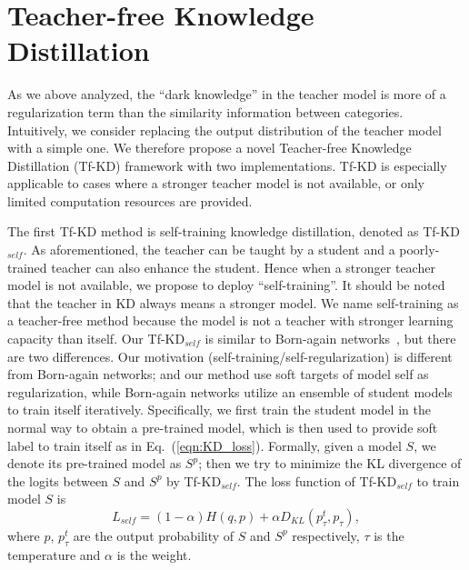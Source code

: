 \documentclass[10pt,twocolumn,letterpaper]{article}
\begin{document}

\section{Teacher-free Knowledge Distillation}
As we above analyzed, the ``dark knowledge'' in the teacher model is more of a regularization term than the similarity information between categories. Intuitively, we consider replacing the output distribution of the teacher model with a simple one. We therefore propose a novel Teacher-free Knowledge Distillation (Tf-KD) framework with two implementations. Tf-KD is especially applicable to cases where a stronger teacher model is not available, or only limited computation resources are provided. %

The first Tf-KD method is self-training knowledge distillation, denoted as Tf-KD$_{self}$. As aforementioned,  the teacher can be taught by a student and a poorly-trained teacher can also enhance the student. Hence when a stronger teacher model is not available, we propose to deploy ``self-training''. It should be noted that the teacher in KD always means a stronger model. We name self-training as a teacher-free method because the model is not a teacher with stronger learning capacity than itself. Our Tf-KD$_{self}$ is similar to Born-again networks~\cite{furlanello2018born}, but there are two differences. Our motivation (self-training/self-regularization) is different from Born-again networks; and our method use soft targets of model self as regularization, while Born-again networks utilize an ensemble of student models to train itself iteratively. Specifically, we first train the student model in the normal way to obtain a pre-trained model, which is then used to provide soft label to train itself as in Eq.~(\ref{eqn:KD_loss}). Formally, given a model $S$, we denote its pre-trained model as $S^{p}$; then we try to minimize the KL divergence of the logits between $S$ and $S^{p}$ by Tf-KD$_{self}$. The loss function of Tf-KD$_{self}$ to train model $S$ is
\begin{equation}
\label{eqn:Tf-KD_self}
    L_{self} = (1-\alpha)H(q, p) + \alpha D_{KL}(p^{t}_{\tau}, p_{\tau}),
\end{equation}
where $p$, $p^{t}_{\tau}$ are the output probability of $S$ and $S^{p}$ respectively, $\tau$ is the temperature and $\alpha$ is the weight.
\end{document}

